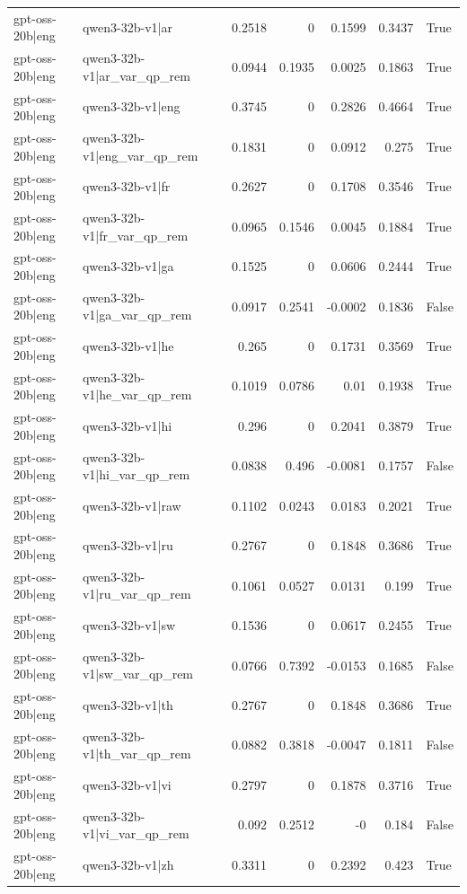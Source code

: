 \begin{table}
\begin{tabular}{l l r r r r l}
gpt-oss-20b|eng & qwen3-32b-v1|ar & 0.2518 & 0 & 0.1599 & 0.3437 & True \\
gpt-oss-20b|eng & qwen3-32b-v1|ar_var_qp_rem & 0.0944 & 0.1935 & 0.0025 & 0.1863 & True \\
gpt-oss-20b|eng & qwen3-32b-v1|eng & 0.3745 & 0 & 0.2826 & 0.4664 & True \\
gpt-oss-20b|eng & qwen3-32b-v1|eng_var_qp_rem & 0.1831 & 0 & 0.0912 & 0.275 & True \\
gpt-oss-20b|eng & qwen3-32b-v1|fr & 0.2627 & 0 & 0.1708 & 0.3546 & True \\
gpt-oss-20b|eng & qwen3-32b-v1|fr_var_qp_rem & 0.0965 & 0.1546 & 0.0045 & 0.1884 & True \\
gpt-oss-20b|eng & qwen3-32b-v1|ga & 0.1525 & 0 & 0.0606 & 0.2444 & True \\
gpt-oss-20b|eng & qwen3-32b-v1|ga_var_qp_rem & 0.0917 & 0.2541 & -0.0002 & 0.1836 & False \\
gpt-oss-20b|eng & qwen3-32b-v1|he & 0.265 & 0 & 0.1731 & 0.3569 & True \\
gpt-oss-20b|eng & qwen3-32b-v1|he_var_qp_rem & 0.1019 & 0.0786 & 0.01 & 0.1938 & True \\
gpt-oss-20b|eng & qwen3-32b-v1|hi & 0.296 & 0 & 0.2041 & 0.3879 & True \\
gpt-oss-20b|eng & qwen3-32b-v1|hi_var_qp_rem & 0.0838 & 0.496 & -0.0081 & 0.1757 & False \\
gpt-oss-20b|eng & qwen3-32b-v1|raw & 0.1102 & 0.0243 & 0.0183 & 0.2021 & True \\
gpt-oss-20b|eng & qwen3-32b-v1|ru & 0.2767 & 0 & 0.1848 & 0.3686 & True \\
gpt-oss-20b|eng & qwen3-32b-v1|ru_var_qp_rem & 0.1061 & 0.0527 & 0.0131 & 0.199 & True \\
gpt-oss-20b|eng & qwen3-32b-v1|sw & 0.1536 & 0 & 0.0617 & 0.2455 & True \\
gpt-oss-20b|eng & qwen3-32b-v1|sw_var_qp_rem & 0.0766 & 0.7392 & -0.0153 & 0.1685 & False \\
gpt-oss-20b|eng & qwen3-32b-v1|th & 0.2767 & 0 & 0.1848 & 0.3686 & True \\
gpt-oss-20b|eng & qwen3-32b-v1|th_var_qp_rem & 0.0882 & 0.3818 & -0.0047 & 0.1811 & False \\
gpt-oss-20b|eng & qwen3-32b-v1|vi & 0.2797 & 0 & 0.1878 & 0.3716 & True \\
gpt-oss-20b|eng & qwen3-32b-v1|vi_var_qp_rem & 0.092 & 0.2512 & -0 & 0.184 & False \\
gpt-oss-20b|eng & qwen3-32b-v1|zh & 0.3311 & 0 & 0.2392 & 0.423 & True \\

\end{tabular}
\end{table}
